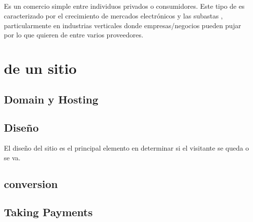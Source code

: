 \subsection{\ctoc}

Es un comercio simple entre individuos privados o consumidores. Este tipo de \ecommerce es caracterizado por el crecimiento de mercados electrónicos y las subastas \online, particularmente en industrias verticales donde empresas/negocios pueden pujar por lo que quieren de entre varios proveedores.

\subsection{\mcommerce}



\section{\keyelements de un sitio \ecommerce \cite{inbook_ecommerce_keyelements}}

\subsection{Domain y Hosting}
\subsection{Diseño}
El diseño del sitio es el principal elemento en determinar si el visitante se queda o se va.

\subsection{\usability}
\subsection{conversion}
\subsection{\checkout}
\subsection{Taking Payments}
